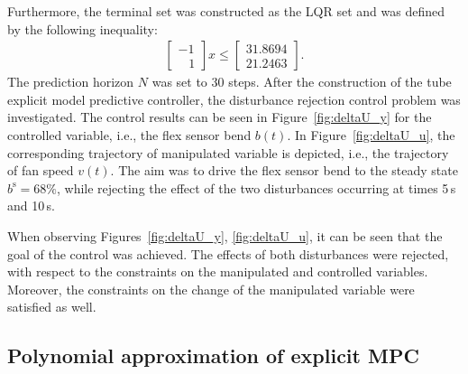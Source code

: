 \documentclass[letterpaper, 10 pt, conference]{ieeeconf}
\begin{document}
Furthermore, the terminal set was constructed as the LQR set and was defined by the following inequality:
\begin{eqnarray}
	\label{eq:setup_terminal_set}
	\begin{bmatrix}
	-1 \\	
	\,\,\,\,\, 1
	\end{bmatrix} x \le 
	\begin{bmatrix}
		31.8694\\	
		21.2463
	\end{bmatrix}.
\end{eqnarray}
The prediction horizon $N$ was set to 30 steps. 
After the construction of the tube explicit model predictive controller, the disturbance rejection control problem was investigated. The control results can be seen in Figure~\ref{fig:deltaU_y} for the controlled variable, i.e., the flex sensor bend $b(t)$. In Figure~\ref{fig:deltaU_u}, the corresponding trajectory of manipulated variable is depicted, i.e., the trajectory of fan speed $v(t)$. The aim was to drive the flex sensor bend to the steady state $ b^\mathrm{s} = 68\%$, while rejecting the effect of the two disturbances occurring at times 5\,s and 10\,s. 

When observing Figures~\ref{fig:deltaU_y}, \ref{fig:deltaU_u}, it can be seen that the goal of the control was achieved. The effects of both disturbances were rejected, with respect to the constraints on the manipulated and controlled variables. Moreover, the constraints on the change of the manipulated variable were satisfied as well.

\subsection{Polynomial approximation of explicit MPC}
\label{sec:polynomial_exp}
\end{document}

